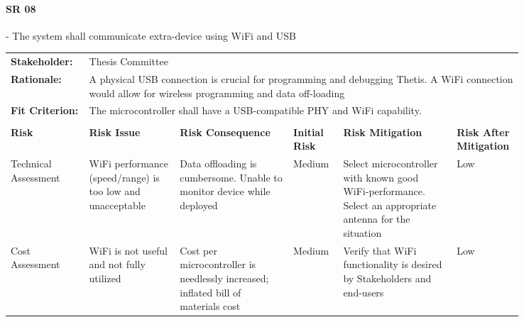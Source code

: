 \begin{landscape}


\paragraph*{SR 08} - The system shall communicate extra-device using WiFi and USB 

{\fontsize{8pt}{8pt}\selectfont
\begin{longtable}{| p{0.12\linewidth} | p{0.16\linewidth} |  p{0.20\linewidth} | p{0.08\linewidth} | p{0.20\linewidth} | p{0.08\linewidth} |}
	\hline \endlastfoot
	
	\hline
	\rowcolor[gray]{0.8}
	\multicolumn{6}{|c|}{ } \\
	\hline
	\textbf{Stakeholder:} & \multicolumn{5}{|l|}{Thesis Committee} \\
	\hline
	\textbf{Rationale:} & \multicolumn{5}{|p{0.8\linewidth}|}{A physical USB connection is crucial for programming and debugging Thetis. A WiFi connection would allow for wireless programming and data off-loading} \\
	\hline
	\textbf{Fit Criterion:} & \multicolumn{5}{|p{0.8\linewidth}|}{The microcontroller shall have a USB-compatible PHY and WiFi capability.} \\
	\hline
	\rowcolor[gray]{0.8}
	\multicolumn{6}{|c|}{ } \\
	\hline
	\textbf{Risk} & \textbf{Risk Issue} & \textbf{Risk Consequence} & \textbf{Initial Risk} & \textbf{Risk Mitigation} & \textbf{Risk \newline After \newline Mitigation} \\
	\hline
	Technical \newline Assessment & WiFi performance (speed/range) is too low and unacceptable & Data offloading is cumbersome. \newline Unable to monitor device while deployed & \cellcolor{yellow} Medium & Select microcontroller with known good WiFi-performance. \newline Select an appropriate antenna for the situation & \cellcolor{green} Low \\
	\hline
	Cost \newline Assessment & WiFi is not useful and not fully utilized & Cost per microcontroller is needlessly increased; inflated bill of materials cost & \cellcolor{yellow} Medium & Verify that WiFi functionality is desired by Stakeholders and end-users & \cellcolor{green} Low \\

\end{longtable}}
\end{landscape}
